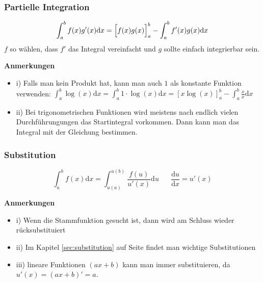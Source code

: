 \documentclass[8pt, a4paper, landscape, fleqn]{scrartcl}
\newenvironment {annotation}[1]
				{\begin{itshape} \begin{small} \textbf{#1} \begin{itemize}}
				{\end{itemize} \end{small} \end{itshape}}
\def\d{\text{d}}
\begin{document}
\begin{multicols*}{3}
				\subsubsection{Partielle Integration}
					\begin{equation*}
						\int_{a}^{b}f(x)g'(x)\text{d}x= \Big{[}f(x)g(x)\Big{]}_a^b-\int_{a}^{b}f'(x)g(x)\text{d}x
					\end{equation*}
					$f$ so wählen, dass $f'$ das Integral vereinfacht und $g$ sollte einfach integrierbar sein. \\
					\begin{annotation}{Anmerkungen}
					    \item[i)]Falls man kein Produkt hat, kann man auch $1$ als konstante Funktion verwenden: $\int_a^b \log(x) \d x = \int_a^b 1 \cdot \log(x) \d x = [x\log(x)]_a^b - \int_a^b \frac{x}{x}\d x$
					    \item[ii)] Bei trigonometrischen Funktionen wird meistens nach endlich vielen Durchführungungen das Startintegral vorkommen. Dann kann man das Integral mit der Gleichung bestimmen.
					\end{annotation}
					
				\subsubsection{Substitution}
					\begin{equation*}
						\int_{a}^{b}f(x)\text{d}x=\int_{u(a)}^{u(b)} \frac{f(u)}{u'(x)}\text{d}u \hspace{20pt} \frac{\text{d}u}{\text{d}x}=u'(x)
					\end{equation*}
					\begin{annotation}{Anmerkungen}
						\item[i)] Wenn die Stammfunktion gesucht ist, dann wird am Schluss wieder rücksubstituiert
						\item[ii)] Im Kapitel \ref{sec:substitution} auf Seite \pageref{sec:substitution} findet man wichtige Substitutionen
						\item[iii)] lineare Funktionen $(ax + b)$ kann man immer substituieren, da $u'(x) = (ax+b)' = a$.
					\end{annotation}

\end{multicols*}
\end{document}
